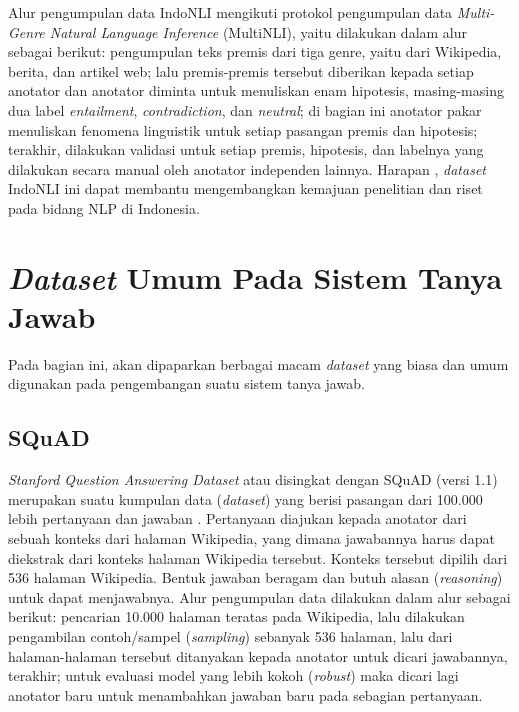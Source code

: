 Alur pengumpulan data IndoNLI mengikuti protokol pengumpulan data \emph{Multi-Genre Natural Language Inference} (MultiNLI), yaitu dilakukan dalam alur sebagai berikut: pengumpulan teks premis dari tiga genre, yaitu dari Wikipedia, berita, dan artikel web; lalu premis-premis tersebut diberikan kepada setiap anotator dan anotator diminta untuk menuliskan enam hipotesis, masing-masing dua label \emph{entailment}, \emph{contradiction}, dan \emph{neutral}; di bagian ini anotator pakar menuliskan fenomena linguistik untuk setiap pasangan premis dan hipotesis; terakhir, dilakukan validasi untuk setiap premis, hipotesis, dan labelnya yang dilakukan secara manual oleh anotator independen lainnya. Harapan \citet{mahendra-etal-2021-indonli}, \emph{dataset} IndoNLI ini dapat membantu mengembangkan kemajuan penelitian dan riset pada bidang NLP di Indonesia.

\section{\emph{Dataset} Umum Pada Sistem Tanya Jawab}
Pada bagian ini, akan dipaparkan berbagai macam \emph{dataset} yang biasa dan umum digunakan pada pengembangan suatu sistem tanya jawab.

\subsection{SQuAD}
\emph{Stanford Question Answering Dataset} atau disingkat dengan SQuAD (versi 1.1) merupakan suatu kumpulan data (\emph{dataset}) yang berisi pasangan dari 100.000 lebih pertanyaan dan jawaban \citep{rajpurkar-etal-2016-squad}. Pertanyaan diajukan kepada anotator dari sebuah konteks dari halaman Wikipedia, yang dimana jawabannya harus dapat diekstrak dari konteks halaman Wikipedia tersebut. Konteks tersebut dipilih dari 536 halaman Wikipedia. Bentuk jawaban beragam dan butuh alasan (\emph{reasoning}) untuk dapat menjawabnya. Alur pengumpulan data dilakukan dalam alur sebagai berikut: pencarian 10.000 halaman teratas pada Wikipedia, lalu dilakukan pengambilan contoh/sampel (\emph{sampling}) sebanyak 536 halaman, lalu dari halaman-halaman tersebut ditanyakan kepada anotator untuk dicari jawabannya, terakhir; untuk evaluasi model yang lebih kokoh (\emph{robust}) maka dicari lagi anotator baru untuk menambahkan jawaban baru pada sebagian pertanyaan.

